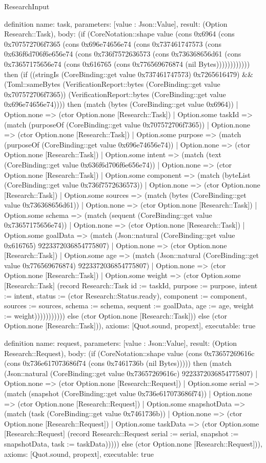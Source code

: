 \begin{lexlean}{ResearchInput}
\begin{semanticmodule}
definition{
 name: task,
 parameters: [value : Json::Value],
 result: (Option Research::Task),
 body: (if (CoreNotation::shape value (cons 0x6964 (cons 0x707572706f7365 (cons 0x696e74656e74 (cons 0x737461747573 (cons 0x636f6d706f6e656e74 (cons 0x736f7572636573 (cons 0x736368656d61 (cons 0x73657175656e74 (cons 0x616765 (cons 0x776569676874 (nil Bytes)))))))))))) then (if ((stringIs (CoreBinding::get value 0x737461747573) 0x7265616479) && (Toml::sameBytes (VerificationReport::bytes (CoreBinding::get value 0x707572706f7365)) (VerificationReport::bytes (CoreBinding::get value 0x696e74656e74)))) then (match (bytes (CoreBinding::get value 0x6964)) | Option.none => (ctor Option.none [Research::Task]) | Option.some taskId => (match (purposeOf (CoreBinding::get value 0x707572706f7365)) | Option.none => (ctor Option.none [Research::Task]) | Option.some purpose => (match (purposeOf (CoreBinding::get value 0x696e74656e74)) | Option.none => (ctor Option.none [Research::Task]) | Option.some intent => (match (text (CoreBinding::get value 0x636f6d706f6e656e74)) | Option.none => (ctor Option.none [Research::Task]) | Option.some component => (match (byteList (CoreBinding::get value 0x736f7572636573)) | Option.none => (ctor Option.none [Research::Task]) | Option.some sources => (match (bytes (CoreBinding::get value 0x736368656d61)) | Option.none => (ctor Option.none [Research::Task]) | Option.some schema => (match (sequent (CoreBinding::get value 0x73657175656e74)) | Option.none => (ctor Option.none [Research::Task]) | Option.some goalData => (match (Json::natural (CoreBinding::get value 0x616765) 9223372036854775807) | Option.none => (ctor Option.none [Research::Task]) | Option.some age => (match (Json::natural (CoreBinding::get value 0x776569676874) 9223372036854775807) | Option.none => (ctor Option.none [Research::Task]) | Option.some weight => (ctor Option.some [Research::Task] (record Research::Task {id := taskId, purpose := purpose, intent := intent, status := (ctor Research::Status.ready), component := component, sources := sources, schema := schema, sequent := goalData, age := age, weight := weight}))))))))))) else (ctor Option.none [Research::Task])) else (ctor Option.none [Research::Task])),
 axioms: [Quot.sound, propext],
 executable: true
}

definition{
 name: request,
 parameters: [value : Json::Value],
 result: (Option Research::Request),
 body: (if (CoreNotation::shape value (cons 0x73657269616c (cons 0x736e617073686f74 (cons 0x7461736b (nil Bytes))))) then (match (Json::natural (CoreBinding::get value 0x73657269616c) 9223372036854775807) | Option.none => (ctor Option.none [Research::Request]) | Option.some serial => (match (snapshot (CoreBinding::get value 0x736e617073686f74)) | Option.none => (ctor Option.none [Research::Request]) | Option.some snapshotData => (match (task (CoreBinding::get value 0x7461736b)) | Option.none => (ctor Option.none [Research::Request]) | Option.some taskData => (ctor Option.some [Research::Request] (record Research::Request {serial := serial, snapshot := snapshotData, task := taskData}))))) else (ctor Option.none [Research::Request])),
 axioms: [Quot.sound, propext],
 executable: true
}


\end{semanticmodule}
\end{lexlean}
